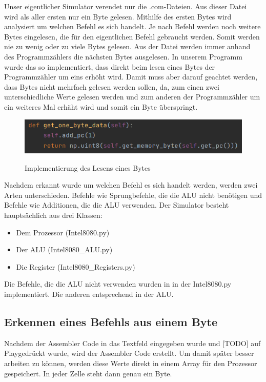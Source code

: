 \documentclass[12pt]{article}
\newcommand{\imgSpaceBefore}{\\[0.2cm]}
\begin{document}
Unser eigentlicher Simulator verendet nur die .com-Dateien. Aus dieser Datei wird als aller ersten nur ein Byte gelesen. Mithilfe des ersten Bytes wird analysiert um welchen Befehl es sich handelt. Je nach Befehl werden noch weitere Bytes eingelesen, die für den eigentlichen Befehl gebraucht werden. Somit werden nie zu wenig oder zu viele Bytes gelesen. Aus der Datei werden immer anhand des Programmzählers die nächsten Bytes ausgelesen. In unserem Programm wurde das so implementiert, dass direkt beim lesen eines Bytes der Programmzähler um eins erhöht wird. Damit muss aber darauf geachtet werden, dass Bytes nicht mehrfach gelesen werden sollen, da, zum einen zwei unterschiedliche Werte gelesen werden und zum anderen der Programmzähler um ein weiteres Mal erhäht wird und somit ein Byte überspringt.
\imgSpaceBefore

\begin{figure}[h]
\caption{Implementierung des Lesens eines Bytes}
\centering
\includegraphics[width=15cm]{Bilder/GetOneByteData}
\label{fig:GetOneByteData}
\end{figure}

Nachdem erkannt wurde um welchen Befehl es sich handelt werden, werden zwei Arten unterschieden. Befehle wie Sprungbefehle, die die ALU nicht benötigen und Befehle wie Additionen, die die ALU verwenden. Der Simulator besteht hauptsächlich aus drei Klassen:

\begin{itemize}
\item Dem Prozessor (Intel8080.py)
\item Der ALU (Intel8080\_ALU.py)
\item Die Register (Intel8080\_Registers.py)
\end{itemize} 

Die Befehle, die die ALU nicht verwenden wurden in in der Intel8080.py implementiert. Die anderen entsprechend in der ALU. 


\subsection{Erkennen eines Befehls aus einem Byte}
Nachdem der Assembler Code in das Textfeld eingegeben wurde und 
[TODO] auf \glqq Play\grqq gedrückt wurde, 
wird der Assembler Code erstellt. Um damit später besser arbeiten zu können, werden diese Werte direkt in einem Array für den Prozessor gespeichert. In jeder Zelle steht dann genau ein Byte.
\end{document}
